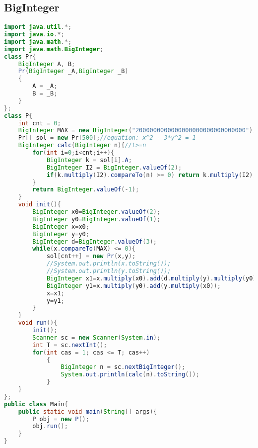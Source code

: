 \subsection{BigInteger}
\begin{lstlisting}[language=java]
import java.util.*;
import java.io.*;
import java.math.*;
import java.math.BigInteger;
class Pr{
    BigInteger A, B;
    Pr(BigInteger _A,BigInteger _B)
    {
        A = _A;
        B = _B;
    }
};
class P{
    int cnt = 0;
    BigInteger MAX = new BigInteger("2000000000000000000000000000000");
    Pr[] sol = new Pr[500];//equation: x^2 - 3*y^2 = 1
    BigInteger calc(BigInteger n){//t>=n
        for(int i=0;i<cnt;i++){
            BigInteger k = sol[i].A;
            BigInteger I2 = BigInteger.valueOf(2);
            if(k.multiply(I2).compareTo(n) >= 0) return k.multiply(I2);            
        }
        return BigInteger.valueOf(-1);
    }
    void init(){
        BigInteger x0=BigInteger.valueOf(2);
        BigInteger y0=BigInteger.valueOf(1);
        BigInteger x=x0;
        BigInteger y=y0;
        BigInteger d=BigInteger.valueOf(3);
        while(x.compareTo(MAX) <= 0){
            sol[cnt++] = new Pr(x,y);
            //System.out.println(x.toString());
            //System.out.println(y.toString());
            BigInteger x1=x.multiply(x0).add(d.multiply(y).multiply(y0));
            BigInteger y1=x.multiply(y0).add(y.multiply(x0));
            x=x1;
            y=y1;
        }
    }
    void run(){
        init();
        Scanner sc = new Scanner(System.in);
        int T = sc.nextInt();
        for(int cas = 1; cas <= T; cas++)
            {
                BigInteger n = sc.nextBigInteger();
                System.out.println(calc(n).toString());
            }
    }
};
public class Main{
    public static void main(String[] args){
        P obj = new P();
        obj.run();
    }
}
\end{lstlisting} 
